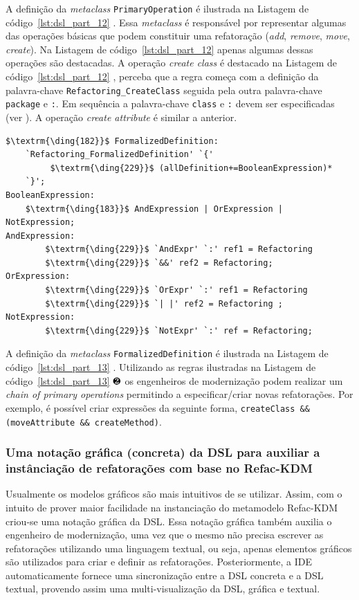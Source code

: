 A definição da \textit{metaclass} \texttt{PrimaryOperation} é ilustrada na Listagem de código~\ref{lst:dsl_part_12} . Essa \textit{metaclass} é responsável por representar algumas das operações básicas que podem constituir uma refatoração (\textit{add}, \textit{remove}, \textit{move}, \textit{create}). Na Listagem de código~\ref{lst:dsl_part_12} apenas algumas dessas operações são destacadas. A operação \textit{create class} é destacado na Listagem de código~\ref{lst:dsl_part_12} , perceba que a regra começa com a definição da palavra-chave \texttt{Refactoring\_CreateClass} seguida pela outra palavra-chave \texttt{package} e \texttt{:}. Em sequência a palavra-chave \texttt{class} e \texttt{:} devem ser especificadas (ver ). A operação \textit{create attribute} é similar a anterior. 

\begin{lstlisting}[language=Xtext, frame=single, basicstyle=\scriptsize, mathescape=true, label={lst:dsl_part_13}, caption={Gramática da DSL - parte 13}]
$\textrm{\ding{182}}$ FormalizedDefinition: 
	`Refactoring_FormalizedDefinition' `{'
		 $\textrm{\ding{229}}$ (allDefinition+=BooleanExpression)*
	`}';
BooleanExpression: 
	$\textrm{\ding{183}}$ AndExpression | OrExpression | NotExpression;
AndExpression: 
		$\textrm{\ding{229}}$ `AndExpr' `:' ref1 = Refactoring 
		$\textrm{\ding{229}}$ `&&' ref2 = Refactoring;
OrExpression: 
		$\textrm{\ding{229}}$ `OrExpr' `:' ref1 = Refactoring
		$\textrm{\ding{229}}$ `| |' ref2 = Refactoring ;
NotExpression: 
		$\textrm{\ding{229}}$ `NotExpr' `:' ref = Refactoring;
\end{lstlisting}

A definição da \textit{metaclass} \texttt{FormalizedDefinition} é ilustrada na Listagem de código~\ref{lst:dsl_part_13} . Utilizando as regras ilustradas na Listagem de código~\ref{lst:dsl_part_13} $\textrm{\ding{183}}$ os engenheiros de modernização podem realizar um \textit{chain of primary operations} permitindo a especificar/criar novas refatorações. Por exemplo, é possível criar expressões da seguinte forma, \texttt{createClass \&\& (moveAttribute \&\& createMethod)}.

\subsubsection{Uma notação gráfica (concreta) da DSL para auxiliar a instânciação de refatorações com base no Refac-KDM}

Usualmente os modelos gráficos são mais intuitivos de se utilizar. Assim, com o intuito de prover maior facilidade na instanciação do metamodelo Refac-KDM criou-se uma notação gráfica da DSL. Essa notação gráfica também auxilia o engenheiro de modernização, uma vez que o mesmo não precisa escrever as refatorações utilizando uma linguagem textual, ou seja, apenas elementos gráficos são utilizados para criar e definir as refatorações. Posteriormente, a IDE automaticamente fornece uma sincronização entre a DSL concreta e a DSL textual, provendo assim uma multi-visualização da DSL, gráfica e textual.

